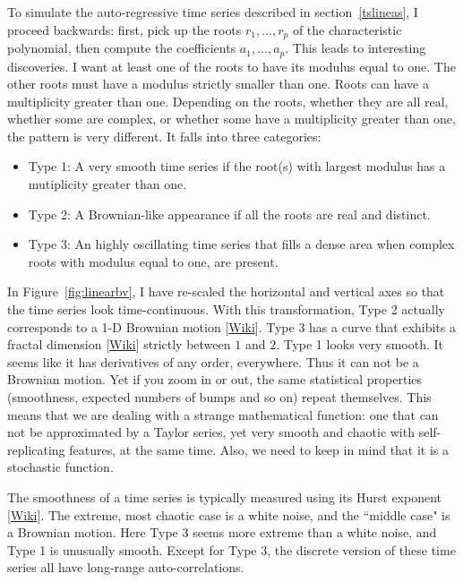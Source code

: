 \documentclass[oneside,10pt]{book}
\begin{document}
To simulate the \textcolor{index}{auto-regressive} time series described in section~\ref{tslineas}, I proceed backwards: first, pick up the
roots $r_1,\dots,r_p$ of the \textcolor{index}{characteristic polynomial}, then compute the coefficients $a_1,\dots,a_p$. 
This leads to interesting discoveries. I want at least one of the roots to have its modulus equal to one. The other roots must have a modulus strictly smaller than one. Roots can have a multiplicity greater than one. Depending on the roots, whether they are all real, whether some are complex, or whether some have a multiplicity greater than one, the pattern is very different. It falls into three categories:
\begin{itemize}
\item Type 1: A very smooth time series if the root(s) with largest modulus has a mutiplicity greater than one.
\item Type 2: A Brownian-like appearance if all the roots are real and distinct.
\item Type 3: An highly oscillating time series that fills a dense area when complex roots with modulus equal to one, are present. 
\end{itemize}
In Figure~\ref{fig:linearbv}, I have re-scaled the horizontal and vertical axes so that the time series look time-continuous. With this transformation, Type 2 actually corresponds to a 1-D \textcolor{index}{Brownian motion} [\href{https://en.wikipedia.org/wiki/Brownian_motion}{Wiki}].
Type 3 has a curve that exhibits a \textcolor{index}{fractal dimension} 
[\href{https://en.wikipedia.org/wiki/Fractal_dimension}{Wiki}] strictly between $1$ and $2$. Type 1 looks very smooth. It seems like it has derivatives of any order, everywhere. Thus it can not be a Brownian motion. Yet if you zoom in or out, the same statistical properties (smoothness, expected numbers of bumps and so on) repeat themselves. This means that we are dealing with a strange mathematical function: one that can not be approximated by a Taylor series, yet very smooth and chaotic with self-replicating features, at the same time. Also, we need to keep in mind that it is a \textcolor{index}{stochastic function}.

The smoothness of a time series is typically measured using its \textcolor{index}{Hurst exponent} [\href{https://en.wikipedia.org/wiki/Hurst_exponent}{Wiki}]. The extreme, most chaotic case is a white noise, and the ``middle case" is a Brownian motion. Here Type 3 seems more extreme than a white noise, and Type 1 is unusually smooth. Except for Type 3, the discrete version of these time series all have long-range auto-correlations.
\end{document}
